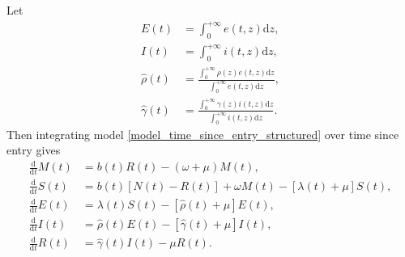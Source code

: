 \documentclass[USenglish]{article}
\newcommand{\md}{\mathrm{d}}
\begin{document}
Let
\begin{subequations}
  \begin{align}
    E(t)
    &= \int_0^{+\infty} e(t, z) \md z,
    \\
    I(t)
    &= \int_0^{+\infty} i(t, z) \md z,
    \\
    \hat{\rho}(t)
    &= \frac{\int_0^{+\infty} \rho(z) e(t, z) \md z}
      {\int_0^{+\infty} e(t, z) \md z},
    \\
    \hat{\gamma}(t)
    &= \frac{\int_0^{+\infty} \gamma(z) i(t, z) \md z}
      {\int_0^{+\infty} i(t, z) \md z}.
  \end{align}
\end{subequations}
Then integrating model \eqref{model_time_since_entry_structured} over
time since entry gives
\begin{subequations}
  \label{model_time_since_entry_structured_agg_tse}
  \begin{align}
    \frac{\md}{\md t} M(t)
    &= b(t) R(t) - \left(\omega + \mu\right) M(t),
    \\
    \frac{\md}{\md t} S(t)
    &= b(t) \left[N(t) - R(t)\right] + \omega M(t)
    - [\lambda(t) + \mu] S(t),
    \\
    \frac{\md}{\md t} E(t)
    &= \lambda(t) S(t)
    - \left[\hat{\rho}(t) + \mu\right] E(t),
    \\
    \frac{\md}{\md t} I(t)
    &= \hat{\rho}(t) E(t)
    - \left[\hat{\gamma}(t) + \mu\right] I(t),
    \\
    \frac{\md}{\md t} R(t)
    &= \hat{\gamma}(t) I(t)
    - \mu R(t).
  \end{align}
\end{subequations}
\end{document}
